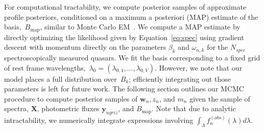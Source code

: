 \documentclass{article} %
\begin{document}
For computational tractability, we compute posterior samples of approximate profile posteriors, conditioned on a maximum a posteriori (MAP) estimate of the basis,~$B_{\text{map}}$, similar to Monte Carlo EM~\cite{wei1990monte}.  
We compute a MAP estimate by directly optimizing the likelihood given by Equation~\ref{eq:spec} using gradient descent with momentum directly on the parameters $\beta_k$ and $\omega_{n,k}$ for the $N_{spec}$ spectroscopically measured quasars.  We fit the basis corresponding to a fixed grid of rest frame wavelengths,~${\lambda_0 = (\lambda_{0,1}, \dots, \lambda_{0,V})}$.  
However, we note that our model places a full distribution over~$B_k$; efficiently integrating out those parameters is left for future work.
The following section outlines our MCMC procedure to compute posterior samples of $\mathbf{w}_n, z_n$, and $m_n$ given the sample of spectra, $\mathbf{X}$, photometric fluxes $\mathbf{y}_{ugriz}$, and $B_{\text{map}}$.
Note that due to analytic intractability, we numerically integrate expressions involving $\int_\Lambda f_n^{(obs)}(\lambda) d\lambda$.

\end{document}

